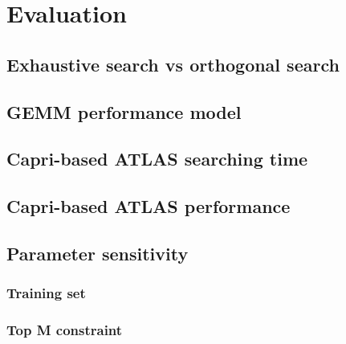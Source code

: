 \section{Evaluation}
\label{sec:evaluation}

  \subsection{Exhaustive search vs \atl orthogonal search}
  \label{sec:exhaustiveVSorthogonal}

  \subsection{GEMM performance model}
  \label{sec:GEMMperf}

  \subsection{Capri-based ATLAS searching time}
  \label{sec:capri_atlas_searching}

  \subsection{Capri-based ATLAS performance}
  \label{sec:capri_atlas_performance}

  \subsection{Parameter sensitivity}
  \label{sec:parametersensitivity}

    \subsubsection{Training set}
    \label{sec:training_set}

    \subsubsection{Top M constraint}
    \label{sec:top_m}
